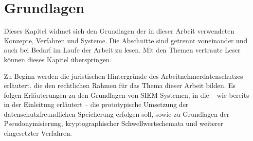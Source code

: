 \chapter{Grundlagen}

\label{cha_basics}

Dieses Kapitel widmet sich den Grundlagen der in dieser Arbeit verwendeten Konzepte, Verfahren und Systeme. Die Abschnitte sind getrennt voneinander und auch bei Bedarf im Laufe der Arbeit zu lesen. Mit den Themen vertraute Leser können dieses Kapitel überspringen.

Zu Beginn werden die juristischen Hintergründe des Arbeitnehmerdatenschutzes erläutert, die den rechtlichen Rahmen für das Thema dieser Arbeit bilden. Es folgen Erläuterungen zu den Grundlagen von SIEM-Systemen, in die -- wie bereits in der Einleitung erläutert -- die prototypische Umsetzung der datenschutzfreundlichen Speicherung erfolgen soll, sowie zu Grundlagen der Pseudonymisierung, kryptographischer Schwellwertschemata und weiterer eingesetzter Verfahren.

%









